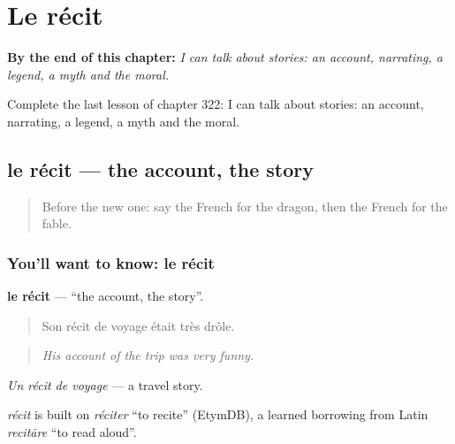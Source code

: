 
\chapter{Le récit}
\label{ch:fr-le-recit}

\begin{chapteropening}
\textbf{By the end of this chapter:} \emph{I can talk about stories: an account, narrating, a legend, a myth and the moral.}

Complete the last lesson of chapter 322: I can talk about stories: an account, narrating, a legend, a myth and the moral.
\end{chapteropening}

\section[le récit]{le récit — the account, the story}

\label{lesson:FR-C322-recit}



\begin{quote}
Before the new one: say the French for the dragon, then the French for the fable.
\end{quote}

\subsection*{You'll want to know: le récit}
\textbf{le récit} — \textquotedblleft{}the account, the story\textquotedblright{}.

\begin{quote}
Son récit de voyage était très drôle.
\end{quote}

\begin{quote}
\emph{His account of the trip was very funny.}
\end{quote}

\emph{Un récit de voyage} — a travel story.

\begin{cousinweb}
\emph{récit} is built on \emph{réciter} \textquotedblleft{}to recite\textquotedblright{} (EtymDB), a learned borrowing from Latin \emph{recitāre} \textquotedblleft{}to read aloud\textquotedblright{}.
\end{cousinweb}

